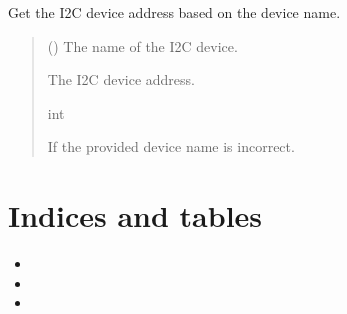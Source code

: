 \documentclass[letterpaper,10pt,english]{sphinxmanual}
\begin{document}
\begin{fulllineitems}
\label{\detokenize{toolsdocs:i2c_reg.get_dev_add}}
\pysigstartsignatures
{}
\pysigstopsignatures
\sphinxAtStartPar
Get the I2C device address based on the device name.
\begin{quote}\begin{description}
\sphinxAtStartPar
{} () \textendash{} The name of the I2C device.

\sphinxAtStartPar
The I2C device address.

\sphinxAtStartPar
int

\sphinxAtStartPar
{} \textendash{} If the provided device name is incorrect.

\end{description}\end{quote}

\end{fulllineitems}



\chapter{Indices and tables}
\label{\detokenize{index:indices-and-tables}}\begin{itemize}
\item {} 
\sphinxAtStartPar
{}

\item {} 
\sphinxAtStartPar
{}

\item {} 
\sphinxAtStartPar
{}

\end{itemize}
\end{document}
